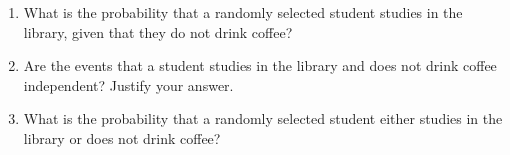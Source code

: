 \documentclass[12pt,twoside]{article}
\newcommand{\pts}[1]{\marginpar{ \small\hspace{0pt} \textit{[#1]} } }
\newcommand{\?}{\stackrel{?}{=}}
\begin{document}
\begin{enumerate}[\bf (a)]


\item What \pts{2} is the probability that a randomly selected student studies in the library, given that they do not drink coffee?
\vspace{25ex}

\item Are the events that a student studies in the library and does not drink coffee independent? Justify your answer. \pts{3}
\vspace{25ex}

     \item What is the \pts{3} probability that a randomly selected student either studies in the library or does not drink coffee?
\vspace{20ex}

\end{enumerate}






  




  
\end{document}
